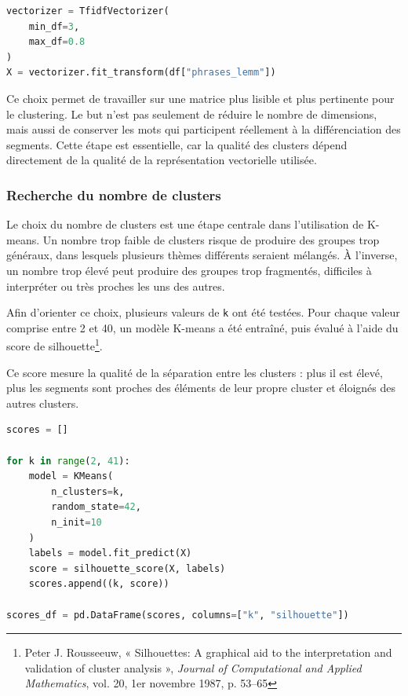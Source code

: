 \documentclass{article}
\begin{document}
\begin{lstlisting}[language=Python, caption={Création de la matrice TF-IDF pour le clustering K-means}]
vectorizer = TfidfVectorizer(
    min_df=3,
    max_df=0.8
)
X = vectorizer.fit_transform(df["phrases_lemm"])
\end{lstlisting}

Ce choix permet de travailler sur une matrice plus lisible et plus pertinente pour le clustering. Le but n'est pas seulement de réduire le nombre de dimensions, mais aussi de conserver les mots qui participent réellement à la différenciation des segments. Cette étape est essentielle, car la qualité des clusters dépend directement de la qualité de la représentation vectorielle utilisée.

\subsubsection{Recherche du nombre de clusters}

Le choix du nombre de clusters est une étape centrale dans l'utilisation de K-means. Un nombre trop faible de clusters risque de produire des groupes trop généraux, dans lesquels plusieurs thèmes différents seraient mélangés. À l'inverse, un nombre trop élevé peut produire des groupes trop fragmentés, difficiles à interpréter ou très proches les uns des autres.

Afin d'orienter ce choix, plusieurs valeurs de \texttt{k} ont été testées. Pour chaque valeur comprise entre 2 et 40, un modèle K-means a été entraîné, puis évalué à l'aide du score de silhouette\footnote{Peter J. Rousseeuw, « Silhouettes: A graphical aid to the interpretation and validation of cluster analysis », \textit{Journal of Computational and Applied Mathematics}, vol. 20, 1er novembre 1987, p. 53–65 }. 

Ce score mesure la qualité de la séparation entre les clusters : plus il est élevé, plus les segments sont proches des éléments de leur propre cluster et éloignés des autres clusters.

\begin{lstlisting}[language=Python, caption={Évaluation du nombre de clusters par score de silhouette}]
scores = []

for k in range(2, 41):
    model = KMeans(
        n_clusters=k,
        random_state=42,
        n_init=10
    )
    labels = model.fit_predict(X)
    score = silhouette_score(X, labels)
    scores.append((k, score))

scores_df = pd.DataFrame(scores, columns=["k", "silhouette"])
\end{lstlisting}
\end{document}
